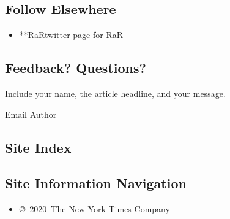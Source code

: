 \hypertarget{follow-elsewhere}{%
\subsection{Follow Elsewhere}\label{follow-elsewhere}}

\begin{itemize}
\tightlist
\item
  \href{https://twitter.com/RaR}{**RaRtwitter page for RaR}
\end{itemize}

\hypertarget{feedback-questions}{%
\subsection{Feedback? Questions?}\label{feedback-questions}}

Include your name, the article headline, and your message.

Email Author

\hypertarget{site-index}{%
\subsection{Site Index}\label{site-index}}

\hypertarget{site-information-navigation}{%
\subsection{Site Information
Navigation}\label{site-information-navigation}}

\begin{itemize}
\tightlist
\item
  \href{https://help.nytimes3xbfgragh.onion/hc/en-us/articles/115014792127-Copyright-notice}{©~2020~The
  New York Times Company}
\end{itemize}

